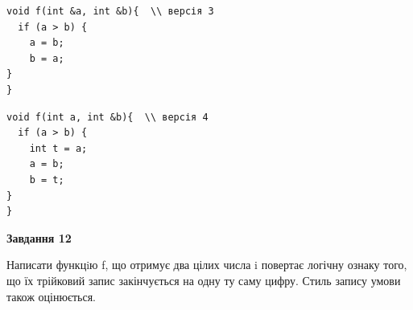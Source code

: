 \documentclass[12pt, ukrainian]{article}
\begin{document}
{\begin {large}
\begin{minipage}[t]{11.0cm}
\vspace{-8mm}\begin{verbatim}
void f(int &a, int &b){  \\ версія 3
  if (a > b) {
    a = b;
    b = a;
}  
}
\end{verbatim}

\vspace{-8mm}\begin{verbatim}
void f(int a, int &b){  \\ версія 4
  if (a > b) {
    int t = a;
    a = b;
    b = t;
}  
}
\end{verbatim}



\begin{center}
\textbf{Завдання 12}
\end{center}

Написати функцiю f, що отримує два цілих числа i повертає логічну ознаку того, що їх трійковий запис закінчується на одну ту саму цифру. Стиль запису умови також оцінюється.\par

\end{minipage}

\end {large}}
\newpage
\end{document}
